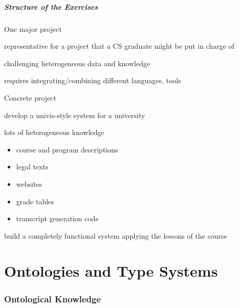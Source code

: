 \begin{frame}\frametitle{Structure of the Exercises}
\begin{blockitems}{One major project}
\item representative for a project that a CS graduate might be put in charge of
\item challenging heterogeneous data and knowledge
\item requires integrating/combining different languages, tools
\end{blockitems}

\begin{blockitems}{Concrete project}
\item develop a univis-style system for a university
\item lots of heterogeneous knowledge
 \begin{itemize}
 \item course and program descriptions
 \item legal texts
 \item websites
 \item grade tables
 \item transcript generation code
 \end{itemize} 
\item build a completely functional system applying the lessons of the course
\end{blockitems}
\end{frame}

\part{Ontologies and Type Systems}

\section{Ontological Knowledge}

